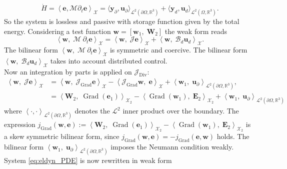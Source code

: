 \documentclass{svjour3}                     %
\DeclareMathOperator*{\Grad}{Grad}
\DeclareMathOperator*{\Div}{Div}
\newcommand{\firstRev}[1]{\textcolor{red!80!black}{#1}}
\begin{document}
	\begin{equation}
	\label{eq:pow_eldyn}
	\dot{H} = \left\langle \bm{e},  \bm{\mathcal{M}} \partial_t \bm{e} \right\rangle_{\mathscr{X}} = \langle \bm{y}_\partial,  \bm{u}_\partial \rangle_{\mathscr{L}^2(\partial\Omega, \mathbb{R}^3)} + \langle \bm{y}_d,  \bm{u}_d \rangle_{\mathscr{L}^2(\Omega, \mathbb{R}^3)}.
	\end{equation}
	So the system is lossless and passive with storage function given by the total energy. Considering a test function $\bm{w} = [\bm{w}_1, \; \bm{W}_2]$ the weak form reads
	\begin{equation*}
	\left\langle \bm{w}, \; \bm{\mathcal{M}} \ \partial_t \bm{e} \right\rangle_{\mathscr{X}} = \left\langle \bm{w}, \; \bm{\mathcal{J}} \bm{e} \right\rangle_{\mathscr{X}} + \left\langle \bm{w}, \; \bm{\mathcal{B}}_d \bm{u}_d \right\rangle_{\mathscr{X}}.
	\end{equation*}
	The bilinear form $\left\langle \bm{w}, \; \bm{\mathcal{M}} \ \partial_t \bm{e} \right\rangle_{\mathscr{X}}$ is symmetric and coercive. The bilinear form $\left\langle \bm{w}, \; \bm{\mathcal{B}}_d \bm{u}_d \right\rangle_{\mathscr{X}}$ takes into account distributed control.\\
	Now an integration by parts is applied on $\bm{\mathcal{J}}_{\Div}$:
	\firstRev{
		\begin{equation}
		\begin{aligned}
		\left\langle \bm{w}, \; \bm{\mathcal{J}} \bm{e} \right\rangle_{\mathscr{X}} &= \left\langle \bm{w}, \; \bm{\mathcal{J}}_{\Grad} \bm{e} \right\rangle_{\mathscr{X}} - \left\langle \bm{\mathcal{J}}_{\Grad} \bm{w}, \; \bm{e} \right\rangle_{\mathscr{X}} + \left\langle \bm{w}_1, \; \bm{u}_\partial \right\rangle_{\mathscr{L}^2(\partial \Omega, \mathbb{R}^3)}, \\
		&= \left\langle \bm{W}_2, \; \Grad(\bm{e}_1) \right\rangle_{\mathscr{X}_2} - \left\langle {\Grad} (\bm{w}_1), \; \bm{E}_2 \right\rangle_{\mathscr{X}_2} + \left\langle \bm{w}_1, \; \bm{u}_\partial \right\rangle_{\mathscr{L}^2(\partial \Omega, \mathbb{R}^3)}
		\end{aligned}
		\end{equation}
	}
	where $\left\langle \cdot,  \cdot \right\rangle_{\mathscr{L}^2(\partial \Omega, \mathbb{R}^3)}$ denotes the $\mathscr{L}^2$ inner product over the boundary. The expression $j_{\Grad}(\bm{w}, \bm{e}) :=\left\langle \bm{W}_2, \; \Grad(\bm{e}_1) \right\rangle_{\mathscr{X}_2} - \left\langle {\Grad} (\bm{w}_1), \; \bm{E}_2 \right\rangle_{\mathscr{X}_2}$ is a skew symmetric bilinear form, since $j_{\Grad}(\bm{w}, \bm{e})=-j_{\Grad}(\bm{e},\bm{w})$ holds. The bilinear form $\left\langle \bm{w}_1, \; \bm{u}_\partial \right\rangle_{\mathscr{L}^2(\partial \Omega, \mathbb{R}^3)}$ imposes the Neumann condition weakly. System \eqref{eq:eldyn_PDE} is now rewritten in weak form
\end{document}
